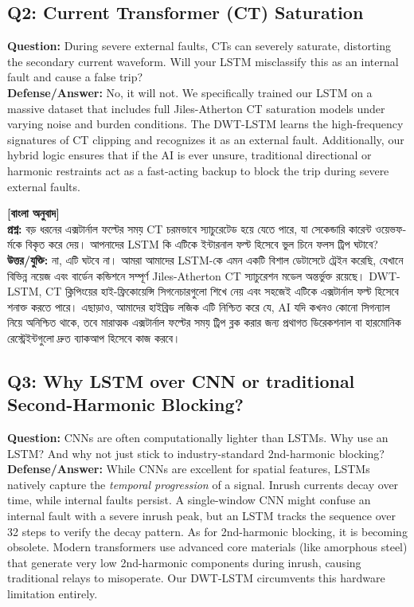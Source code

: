 \documentclass[12pt]{article}
\begin{document}
\subsection*{Q2: Current Transformer (CT) Saturation}
\textbf{Question:} During severe external faults, CTs can severely saturate, distorting the secondary current waveform. Will your LSTM misclassify this as an internal fault and cause a false trip? \\
\textbf{Defense/Answer:} No, it will not. We specifically trained our LSTM on a massive dataset that includes full Jiles-Atherton CT saturation models under varying noise and burden conditions. The DWT-LSTM learns the high-frequency signatures of CT clipping and recognizes it as an external fault. Additionally, our hybrid logic ensures that if the AI is ever unsure, traditional directional or harmonic restraints act as a fast-acting backup to block the trip during severe external faults.

\begin{bengali}
\textbf{[বাংলা অনুবাদ]} \\
\textbf{প্রশ্ন:} বড় ধরনের এক্সটার্নাল ফল্টের সময় CT চরমভাবে স্যাচুরেটেড হয়ে যেতে পারে, যা সেকেন্ডারি কারেন্ট ওয়েভফর্মকে বিকৃত করে দেয়। আপনাদের LSTM কি এটিকে ইন্টারনাল ফল্ট হিসেবে ভুল চিনে ফলস ট্রিপ ঘটাবে? \\
\textbf{উত্তর/যুক্তি:} না, এটি ঘটবে না। আমরা আমাদের LSTM-কে এমন একটি বিশাল ডেটাসেটে ট্রেইন করেছি, যেখানে বিভিন্ন নয়েজ এবং বার্ডেন কন্ডিশনে সম্পূর্ণ Jiles-Atherton CT স্যাচুরেশন মডেল অন্তর্ভুক্ত রয়েছে। DWT-LSTM, CT ক্লিপিংয়ের হাই-ফ্রিকোয়েন্সি সিগনেচারগুলো শিখে নেয় এবং সহজেই এটিকে এক্সটার্নাল ফল্ট হিসেবে শনাক্ত করতে পারে। এছাড়াও, আমাদের হাইব্রিড লজিক এটি নিশ্চিত করে যে, AI যদি কখনও কোনো সিগন্যাল নিয়ে অনিশ্চিত থাকে, তবে মারাত্মক এক্সটার্নাল ফল্টের সময় ট্রিপ ব্লক করার জন্য প্রথাগত ডিরেকশনাল বা হারমোনিক রেস্ট্রেইন্টগুলো দ্রুত ব্যাকআপ হিসেবে কাজ করবে।
\end{bengali}

\subsection*{Q3: Why LSTM over CNN or traditional Second-Harmonic Blocking?}
\textbf{Question:} CNNs are often computationally lighter than LSTMs. Why use an LSTM? And why not just stick to industry-standard 2nd-harmonic blocking? \\
\textbf{Defense/Answer:} While CNNs are excellent for spatial features, LSTMs natively capture the \textit{temporal progression} of a signal. Inrush currents decay over time, while internal faults persist. A single-window CNN might confuse an internal fault with a severe inrush peak, but an LSTM tracks the sequence over 32 steps to verify the decay pattern. As for 2nd-harmonic blocking, it is becoming obsolete. Modern transformers use advanced core materials (like amorphous steel) that generate very low 2nd-harmonic components during inrush, causing traditional relays to misoperate. Our DWT-LSTM circumvents this hardware limitation entirely.
\end{document}

